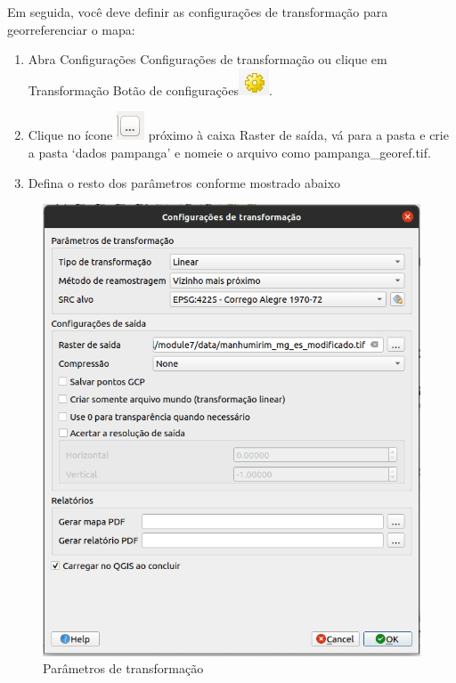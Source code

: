 \documentclass[
]{krantz}
\providecommand{\tightlist}{%
  \setlength{\itemsep}{0pt}\setlength{\parskip}{0pt}}
\begin{document}
Em seguida, você deve definir as configurações de transformação para georreferenciar o mapa:

\begin{enumerate}
\def\labelenumi{\arabic{enumi}.}
\setcounter{enumi}{2}
\tightlist
\item
  Abra Configurações Configurações de transformação ou clique em Transformação Botão de configurações\includegraphics{media/modulo7/georef-settings-btn.png}.
\item
  Clique no ícone \includegraphics{media/modulo7/dots.png} próximo à caixa Raster de saída, vá para a pasta e crie a pasta `dados pampanga' e nomeie o arquivo como pampanga\_georef.tif.
\item
  Defina o resto dos parâmetros conforme mostrado abaixo
\end{enumerate}

\begin{figure}
\centering
\includegraphics{media/modulo7/transformation-settings.png}
\caption{Parâmetros de transformação}
\end{figure}
\end{document}
